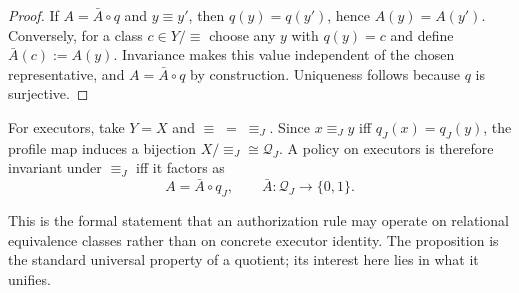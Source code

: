 \documentclass[10pt,twocolumn]{article}
\newcommand{\Profiles}{\mathcal{Q}}
\begin{document}
\begin{proof}
If \(A=\bar A\circ q\) and \(y\equiv y'\), then \(q(y)=q(y')\), hence
\(A(y)=A(y')\). Conversely, for a class \(c\in Y/{\equiv}\) choose any \(y\)
with \(q(y)=c\) and define \(\bar A(c):=A(y)\). Invariance makes this value
independent of the chosen representative, and \(A=\bar A\circ q\) by
construction. Uniqueness follows because \(q\) is surjective.
\end{proof}

For executors, take \(Y=X\) and \(\equiv\;=\;\equiv_J\). Since
\(x\equiv_J y\) iff \(q_J(x)=q_J(y)\), the profile map induces a bijection
\(X/{\equiv_J}\cong\Profiles_J\). A policy on executors is therefore invariant
under \(\equiv_J\) iff it factors as
\[
A=\bar A\circ q_J,
\qquad
\bar A:\Profiles_J\rightarrow\{0,1\}.
\]

This is the formal statement that an authorization rule may operate on
relational equivalence classes rather than on concrete executor identity. The
proposition is the standard universal property of a quotient; its interest here
lies in what it unifies.
\end{document}
